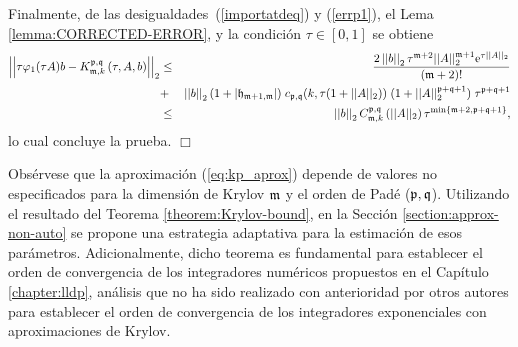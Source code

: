Finalmente, de las desigualdades~(\ref{importatdeq}) y (\ref{errp1}), el Lema \ref{lemma:CORRECTED-ERROR}, y la condición $\tau \in [0,1]$ se obtiene
\begin{eqnarray*}
	\left\lvert\left\lvert  \tau \varphi_1(\tau A)b-  K_{\mathfrak{m},k}^{\mathfrak{p},\mathfrak{q}}\left( \tau,  A , b \right)\right\rvert\right\rvert_2
	&\leq& \frac{2 \left\lvert \left\lvert b \right\rvert \right\rvert_2 \tau^{\mathfrak{m}+2}  \vert\lvert A\rvert\rvert^{\mathfrak{m}+1}_2
		\mathrm{e}^{\tau \lvert\lvert A\rvert\rvert_2}}{(\mathfrak{m}+2)!}\\
	&+&
	\left\lvert \left\lvert b \right\rvert \right\rvert_2 (1+\lvert\mathfrak{h}_{\mathfrak{m}+1,\mathfrak{m}}\rvert) \; c_{\mathfrak{p},\mathfrak{q}}(k,\tau (1+\lvert\lvert A \rvert\rvert_2))
	\; (1 + \lvert\lvert A \rvert\rvert_2^{\mathfrak{p}+\mathfrak{q}+1}) \; \tau^{\mathfrak{p}+\mathfrak{q}+1}\\
	& \leq & \left\lvert \left\lvert b \right\rvert \right\rvert_2 C_{\mathfrak{m},k}^{\mathfrak{p},\mathfrak{q}}\left(\lvert\lvert A \rvert\rvert_2\right)\tau^{\mathrm{min}\left\{ \mathfrak{m}+2,\mathfrak{p}+\mathfrak{q}+1 \right\}},
\end{eqnarray*}
lo cual concluye la prueba.
$\Box$

Obsérvese que la aproximación (\ref{eq:kp_aprox}) depende de valores no especificados para la dimensión de Krylov $\mathfrak{m}$ y el orden de Padé ($\mathfrak{p},\mathfrak{q}$). Utilizando el resultado del Teorema \ref{theorem:Krylov-bound}, en la Sección \ref{section:approx-non-auto} se propone una estrategia adaptativa para la estimación de esos parámetros. Adicionalmente, dicho teorema es fundamental para establecer el orden de convergencia de los integradores numéricos propuestos en el Capítulo \ref{chapter:lldp}, análisis que no ha sido realizado con anterioridad por otros autores para establecer el orden de convergencia de los integradores exponenciales con aproximaciones de Krylov.


